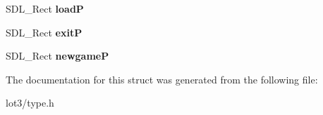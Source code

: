 \begin{DoxyCompactItemize}
\item 
S\+D\+L\+\_\+\+Rect {\bfseries loadP}\hypertarget{structbackground_ad1fab57d015a9770bf50f5e3d38089e6}{}\label{structbackground_ad1fab57d015a9770bf50f5e3d38089e6}

\item 
S\+D\+L\+\_\+\+Rect {\bfseries exitP}\hypertarget{structbackground_a2360abe185abdf12fd8583bfd70f66ae}{}\label{structbackground_a2360abe185abdf12fd8583bfd70f66ae}

\item 
S\+D\+L\+\_\+\+Rect {\bfseries newgameP}\hypertarget{structbackground_a5476a37aac815215b2e66b31852a337c}{}\label{structbackground_a5476a37aac815215b2e66b31852a337c}

\end{DoxyCompactItemize}


The documentation for this struct was generated from the following file\+:\begin{DoxyCompactItemize}
\item 
lot3/type.\+h\end{DoxyCompactItemize}
